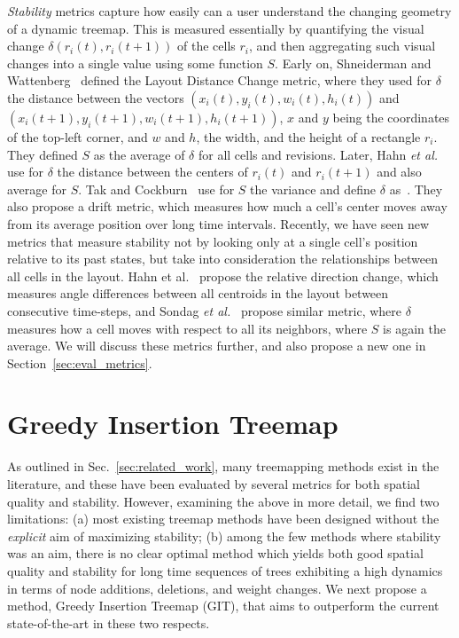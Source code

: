 \noindent\emph{Stability} metrics capture how easily can a user understand the changing geometry of a dynamic treemap. This is measured essentially by quantifying the visual change $\delta(r_i(t), r_i(t+1))$ of the cells $r_i$, and then aggregating such visual changes into a single value using some function $S$. Early on, Shneiderman and Wattenberg~\cite{ordered} defined the Layout Distance Change metric, where they used for $\delta$ the distance between the vectors $(x_i(t), y_i(t), w_i(t), h_i(t))$ and $(x_i(t+1), y_i(t+1), w_i(t+1), h_i(t+1))$, $x$ and $y$ being the coordinates of the top-left corner, and $w$ and $h$, the width, and the height of a rectangle $r_i$. They defined $S$ as the average of $\delta$ for all cells and revisions. Later, Hahn \emph{et al.}~\cite{hahn10} use for $\delta$ the distance between the centers of $r_i(t)$ and $r_i(t+1)$ and also average for $S$. Tak and Cockburn~\cite{hilbert_moore} use for $S$ the variance and define $\delta$ as~\cite{ordered}. They also propose a drift metric, which measures how much a cell's center moves away from its average position over long time intervals. Recently, we have seen new metrics that measure stability not by looking only at a single cell's position relative to its past states, but take into consideration the relationships between all cells in the layout. Hahn et al.~\cite{Hahn2017} propose the relative direction change, which measures angle differences between all centroids in the layout between consecutive time-steps, and Sondag \emph{et al.}~\cite{sondag17} propose similar metric, where $\delta$ measures how a cell moves with respect to all its neighbors, where $S$ is again the average.
We will discuss these metrics further, and also propose a new one in Section~\ref{sec:eval_metrics}.

\section{Greedy Insertion Treemap}
\label{sec:git}
%
As outlined in Sec.~\ref{sec:related_work}, many treemapping methods exist in the literature, and these have been evaluated by several metrics for both spatial quality and stability. However, examining the above in more detail, we find two limitations: (a) most existing treemap methods have been designed without the \emph{explicit} aim of maximizing stability; (b) among the few methods where stability was an aim, there is no clear optimal method which yields both good spatial quality and stability for long time sequences of trees exhibiting a high dynamics in terms of node additions, deletions, and weight changes. We next propose a method, Greedy Insertion Treemap (GIT), that aims to outperform the current state-of-the-art in these two respects.


